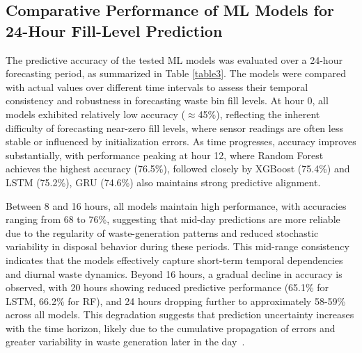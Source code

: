 \documentclass[final,5p,times,twocolumn]{elsarticle}
\begin{document}
\begin{table}[htbp]
\centering
\caption{Blockchain platforms' performance comparison}\label{table2}
\end{table}

\subsection{Comparative Performance of ML Models for 24-Hour Fill-Level Prediction}
The predictive accuracy of the tested ML models was evaluated over a 24-hour forecasting period, as summarized in Table \ref{table3}. The models were compared with actual values over different time intervals to assess their temporal consistency and robustness in forecasting waste bin fill levels. At hour 0, all models exhibited relatively low accuracy ($\approx$45\%), reflecting the inherent difficulty of forecasting near-zero fill levels, where sensor readings are often less stable or influenced by initialization errors. As time progresses, accuracy improves substantially, with performance peaking at hour 12, where Random Forest achieves the highest accuracy (76.5\%), followed closely by XGBoost (75.4\%) and LSTM (75.2\%), GRU (74.6\%) also maintains strong predictive alignment. 

Between 8 and 16 hours, all models maintain high performance, with accuracies ranging from 68 to 76\%, suggesting that mid-day predictions are more reliable due to the regularity of waste-generation patterns and reduced stochastic variability in disposal behavior during these periods. This mid-range consistency indicates that the models effectively capture short-term temporal dependencies and diurnal waste dynamics. Beyond 16 hours, a gradual decline in accuracy is observed, with 20 hours showing reduced predictive performance (65.1\% for LSTM, 66.2\% for RF), and 24 hours dropping further to approximately 58-59\% across all models. This degradation suggests that prediction uncertainty increases with the time horizon, likely due to the cumulative propagation of errors and greater variability in waste generation later in the day~\cite{liu2025enhancing}. 
\end{document}
